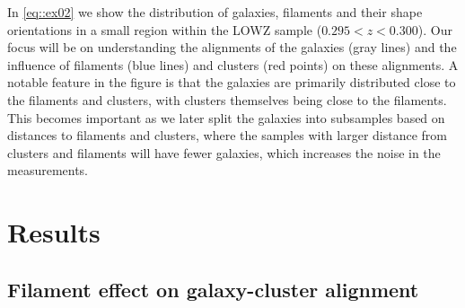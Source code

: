 \documentclass[usenatbib,useAMS]{mnras}
\theoremstyle{remark}
\newcommand{\sukhdeep}[1]{{\textcolor{magenta}{SS: #1}}}
\begin{document}
        In \autoref{eq::ex02} we show the distribution of galaxies, filaments and their shape orientations in a small 
        region within the LOWZ sample ($0.295<z<0.300$). Our focus will be on understanding the alignments of the galaxies (gray lines)
        and the influence of filaments (blue lines) and clusters (red points) on these alignments. 
        A notable feature in the figure is that the galaxies are primarily distributed close to the 
        filaments and clusters, with clusters themselves being close to the filaments. This becomes important as we later split the galaxies into 
        subsamples based on distances to filaments and clusters, where the samples with larger distance from clusters and filaments will have fewer 
        galaxies, which increases the noise in the measurements.




\section{Results}
\subsection{Filament effect on galaxy-cluster alignment}	\label{sec::GC}
\end{document}
